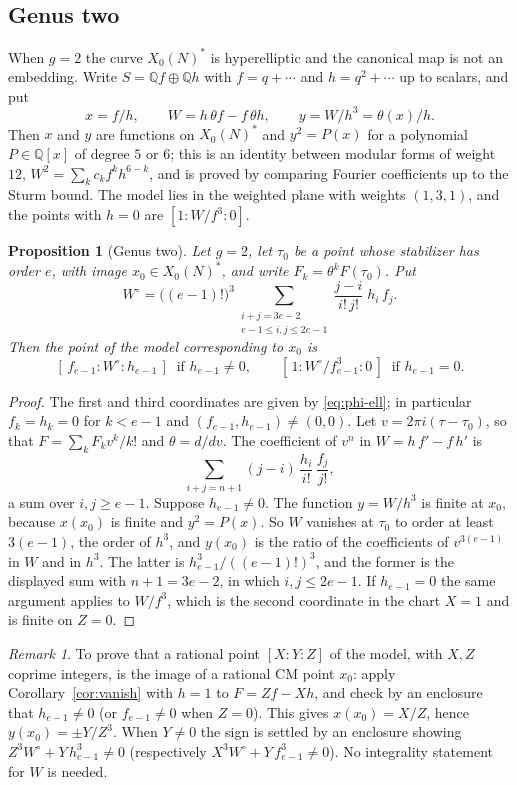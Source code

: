 \documentclass[11pt]{amsart}
\newtheorem{proposition}[theorem]{Proposition}
\theoremstyle{definition}
\theoremstyle{remark}
\newtheorem{remark}[theorem]{Remark}
\newcommand{\Q}{\mathbb{Q}}
\newcommand{\Xs}{X_0(N)^*}
\begin{document}
\subsection*{Genus two}
When $g=2$ the curve $\Xs$ is hyperelliptic and the canonical map is not an
embedding.  Write $S=\Q f\oplus\Q h$ with $f=q+\cdots$ and $h=q^2+\cdots$ up to
scalars, and put
\[
x=f/h,\qquad W=h\,\theta f-f\,\theta h,\qquad y=W/h^3=\theta(x)/h .
\]
Then $x$ and $y$ are functions on $\Xs$ and $y^2=P(x)$ for a polynomial
$P\in\Q[x]$ of degree $5$ or $6$; this is an identity between modular forms of
weight $12$, $W^2=\sum_kc_kf^kh^{6-k}$, and is proved by comparing Fourier
coefficients up to the Sturm bound.  The model lies in the weighted plane with
weights $(1,3,1)$, and the points with $h=0$ are $[1:W/f^3:0]$.

\begin{proposition}[Genus two]\label{prop:genus2}
Let $g=2$, let $\tau_0$ be a point whose stabilizer has order $e$, with image
$x_0\in\Xs$, and write $F_k=\theta^kF(\tau_0)$.  Put
\[
W^{\circ}=\bigl((e-1)!\bigr)^3\sum_{\substack{i+j=3e-2\\ e-1\le i,j\le 2e-1}}
\frac{j-i}{i!\,j!}\;h_i\,f_j .
\]
Then the point of the model corresponding to $x_0$ is
\[
[\,f_{e-1}:W^{\circ}:h_{e-1}\,]\ \text{ if } h_{e-1}\ne0,
\qquad
[\,1:W^{\circ}/f_{e-1}^{3}:0\,]\ \text{ if } h_{e-1}=0 .
\]
\end{proposition}
\begin{proof}
The first and third coordinates are given by \eqref{eq:phi-ell}; in particular
$f_k=h_k=0$ for $k<e-1$ and $(f_{e-1},h_{e-1})\ne(0,0)$.  Let
$v=2\pi i(\tau-\tau_0)$, so that $F=\sum_kF_kv^k/k!$ and $\theta=d/dv$.  The
coefficient of $v^n$ in $W=h\,f'-f\,h'$ is
\[
\sum_{i+j=n+1}(j-i)\,\frac{h_i}{i!}\,\frac{f_j}{j!},
\]
a sum over $i,j\ge e-1$.  Suppose $h_{e-1}\ne0$.  The function $y=W/h^3$ is
finite at $x_0$, because $x(x_0)$ is finite and $y^2=P(x)$.  So $W$ vanishes
at $\tau_0$ to order at least $3(e-1)$, the order of $h^3$, and $y(x_0)$ is
the ratio of the coefficients of $v^{3(e-1)}$ in $W$ and in $h^3$.  The latter
is $h_{e-1}^3/((e-1)!)^3$, and the former is the displayed sum with $n+1=3e-2$,
in which $i,j\le 2e-1$.  If $h_{e-1}=0$ the same argument applies to $W/f^3$,
which is the second coordinate in the chart $X=1$ and is finite on $Z=0$.
\end{proof}

\begin{remark}\label{rem:genus2}
To prove that a rational point $[X:Y:Z]$ of the model, with $X,Z$ coprime
integers, is the image of a rational CM point $x_0$: apply
Corollary~\ref{cor:vanish} with $h=1$ to $F=Zf-Xh$, and check by an enclosure
that $h_{e-1}\ne0$ (or $f_{e-1}\ne0$ when $Z=0$).  This gives $x(x_0)=X/Z$,
hence $y(x_0)=\pm Y/Z^3$.  When $Y\ne0$ the sign is settled by an enclosure
showing $Z^3W^{\circ}+Y\,h_{e-1}^3\ne0$ (respectively
$X^3W^{\circ}+Y\,f_{e-1}^3\ne0$).  No integrality statement for $W$ is needed.
\end{remark}
\end{document}
